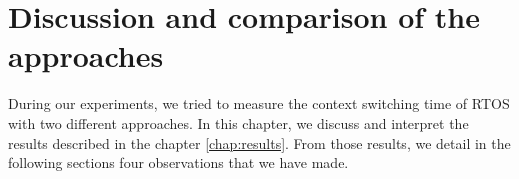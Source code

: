 \chapter{Discussion and comparison of the approaches\label{chap:discuss}}

During our experiments, we tried to measure the context switching time of RTOS with two different approaches.
In this chapter, we discuss and interpret the results described in the chapter \ref{chap:results}.
From those results, we detail in the following sections four observations that we have made.




